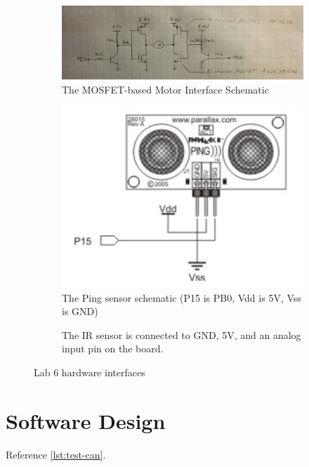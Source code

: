 \documentclass[12pt]{article}
\begin{document}
\begin{figure}[H]
  \centering
  \begin{subfigure}[b]{0.45\textwidth}
    \includegraphics[width=\textwidth]{./img/motor-schematic.png}
    \caption{The MOSFET-based Motor Interface Schematic}
    \label{fig:mosfet-schematic}
  \end{subfigure}
  \begin{subfigure}[b]{0.45\textwidth}
    \includegraphics[width=\textwidth]{./img/ping-schematic.png}
    \caption{The Ping sensor schematic (P15 is PB0, Vdd is 5V, Vss is GND)}
    \label{fig:ping-schematic}
  \end{subfigure}
  \begin{subfigure}[b]{0.45\textwidth}
    \caption{The IR sensor is connected to GND, 5V, and an analog input pin on the board.}
  \end{subfigure}
  \caption{Lab 6 hardware interfaces}
  \label{fig:hardware-design}
\end{figure}

\section{Software Design}
Reference \cref{lst:test-can}.
\end{document}
